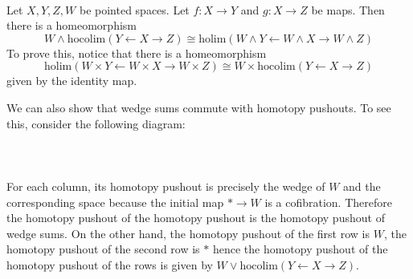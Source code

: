 \documentclass[a4paper]{article}
\begin{document}
\begin{eg}{}{}\\
Let $X,Y,Z,W$ be pointed spaces. Let $f:X\to Y$ and $g:X\to Z$ be maps. Then there is a homeomorphism $$W\wedge\text{hocolim}(Y\leftarrow X\rightarrow Z)\cong\text{holim}(W\wedge Y\leftarrow W\wedge X\rightarrow W\wedge Z)$$ To prove this, notice that there is a homeomorphism $$\text{holim}(W\times Y\leftarrow W\times X\rightarrow W\times Z)\cong W\times\text{hocolim}(Y\leftarrow X\rightarrow Z)$$ given by the identity map. 

We can also show that wedge sums commute with homotopy pushouts. To see this, consider the following diagram: \\~\\
\\~\\
For each column, its homotopy pushout is precisely the wedge of $W$ and the corresponding space because the initial map $\ast\to W$ is a cofibration. Therefore the homotopy pushout of the homotopy pushout is the homotopy pushout of wedge sums. On the other hand, the homotopy pushout of the first row is $W$, the homotopy pushout of the second row is $\ast$ hence the homotopy pushout of the homotopy pushout of the rows is given by $W\vee\text{hocolim}(Y\leftarrow X\rightarrow Z)$. 


\end{eg}
\end{document}
